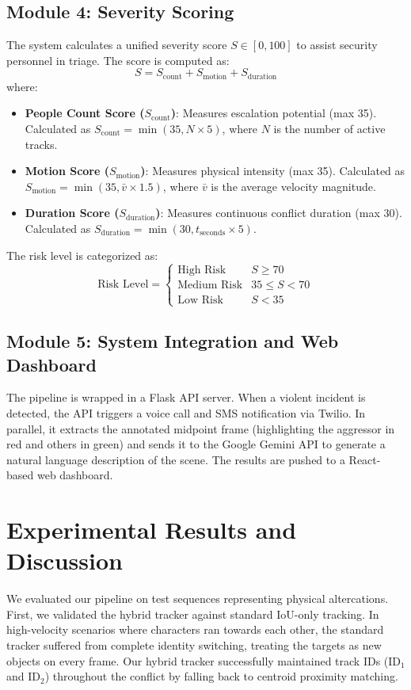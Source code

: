 \documentclass[conference]{IEEEtran}
\begin{document}
\subsection{Module 4: Severity Scoring}
The system calculates a unified severity score $S \in [0, 100]$ to assist security personnel in triage. The score is computed as:
\begin{equation}
S = S_{\text{count}} + S_{\text{motion}} + S_{\text{duration}}
\end{equation}
where:
\begin{itemize}
    \item \textbf{People Count Score ($S_{\text{count}}$)}: Measures escalation potential (max 35). Calculated as $S_{\text{count}} = \min(35, N \times 5)$, where $N$ is the number of active tracks.
    \item \textbf{Motion Score ($S_{\text{motion}}$)}: Measures physical intensity (max 35). Calculated as $S_{\text{motion}} = \min(35, \bar{v} \times 1.5)$, where $\bar{v}$ is the average velocity magnitude.
    \item \textbf{Duration Score ($S_{\text{duration}}$)}: Measures continuous conflict duration (max 30). Calculated as $S_{\text{duration}} = \min(30, t_{\text{seconds}} \times 5)$.
\end{itemize}
The risk level is categorized as:
\begin{equation}
\text{Risk Level} = \begin{cases} 
\text{High Risk} & S \ge 70 \\ 
\text{Medium Risk} & 35 \le S < 70 \\ 
\text{Low Risk} & S < 35 
\end{cases}
\end{equation}

\subsection{Module 5: System Integration and Web Dashboard}
The pipeline is wrapped in a Flask API server. When a violent incident is detected, the API triggers a voice call and SMS notification via Twilio. In parallel, it extracts the annotated midpoint frame (highlighting the aggressor in red and others in green) and sends it to the Google Gemini API to generate a natural language description of the scene. The results are pushed to a React-based web dashboard.

\section{Experimental Results and Discussion}
We evaluated our pipeline on test sequences representing physical altercations. First, we validated the hybrid tracker against standard IoU-only tracking. In high-velocity scenarios where characters ran towards each other, the standard tracker suffered from complete identity switching, treating the targets as new objects on every frame. Our hybrid tracker successfully maintained track IDs ($\text{ID}_1$ and $\text{ID}_2$) throughout the conflict by falling back to centroid proximity matching.
\end{document}
